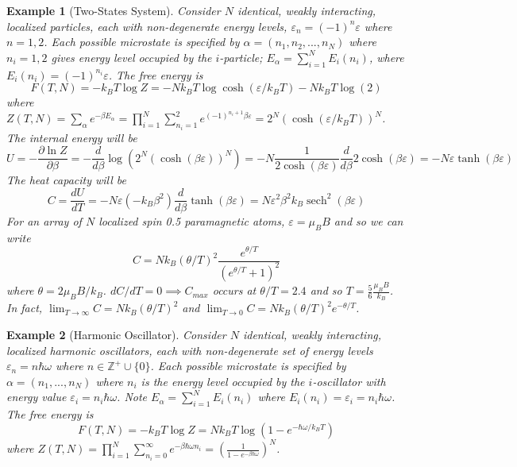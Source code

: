 \documentclass[a4paper]{article}
\DeclareMathOperator{\sech}{sech}
\newtheorem{eg}{Example}[section]
\theoremstyle{new}
\begin{document}
\begin{eg}[Two-States System]
Consider $N$ identical, weakly interacting, localized particles, each with non-degenerate energy levels, $\varepsilon_n=(-1)^n\varepsilon$ where $n=1,2$. Each possible microstate is specified by $\alpha=(n_1,n_2,...,n_N)$ where $n_i=1,2$ gives energy level occupied by the $i$-particle; $E_\alpha=\sum_{i=1}^NE_i(n_i)$, where $E_i(n_i)=(-1)^{n_i}\varepsilon$. The free energy is
$$F(T,N)=-k_BT\log Z=-Nk_BT\log\cosh(\varepsilon/k_BT) -Nk_BT\log(2)$$
where $Z(T,N)=\sum_\alpha e^{-\beta E_\alpha}=\prod_{i=1}^N\sum_{n_i=1}^2e^{(-1)^{n_i+1}\beta\varepsilon}=2^N(\cosh(\varepsilon/k_BT))^N$. The internal energy will be
$$U=-\frac{\partial \ln Z}{\partial\beta}=-\frac{d}{d\beta}\log(2^N(\cosh(\beta\varepsilon))^N)=-N\frac{1}{2\cosh(\beta\varepsilon)}\frac{d}{d\beta}2\cosh(\beta\varepsilon)=-N\varepsilon\tanh(\beta\varepsilon)$$
The heat capacity will be
$$C=\frac{dU}{dT}=-N\varepsilon(-k_B\beta^2)\frac{d}{d\beta}\tanh(\beta\varepsilon)=N\varepsilon^2\beta^2k_B\sech^2(\beta\varepsilon)$$
For an array of $N$ localized spin 0.5 paramagnetic atoms, $\varepsilon=\mu_BB$ and so we can write
$$C=Nk_B(\theta/T)^2\frac{e^{\theta/T}}{(e^{\theta/T}+1)^2}$$
where $\theta=2\mu_BB/k_B$. $dC/dT=0\implies C_{max}$ occurs at $\theta/T=2.4$ and so $T=\frac{5}{6}\frac{\mu_BB}{k_B}$. In fact, $\lim_{T\rightarrow\infty}C=Nk_B(\theta/T)^2$ and $\lim_{T\rightarrow0}C=Nk_B(\theta/T)^2e^{-\theta/T}$.
\end{eg}
\begin{eg}[Harmonic Oscillator]
Consider $N$ identical, weakly interacting, localized harmonic oscillators, each with non-degenerate set of energy levels $\varepsilon_n=n\hbar\omega$ where $n\in\mathbb{Z}^+\cup\{0\}$. Each possible microstate is specified by $\alpha=(n_1,...,n_N)$ where $n_i$ is the energy level occupied by the $i$-oscillator with energy value $\varepsilon_i=n_i\hbar\omega$. Note $E_\alpha=\sum_{i=1}^NE_i(n_i)$ where $E_i(n_i)=\varepsilon_i=n_i\hbar\omega$. The free energy is
$$F(T,N)=-k_BT\log Z= Nk_BT\log(1-e^{-\hbar\omega/k_BT})$$
where $Z(T,N)=\prod_{i=1}^N\sum_{n_i=0}^\infty e^{-\beta\hbar\omega n_i}=(\frac{1}{1-e^{-\beta\hbar\omega}})^N$. 
\end{eg}
\newpage
\end{document}
